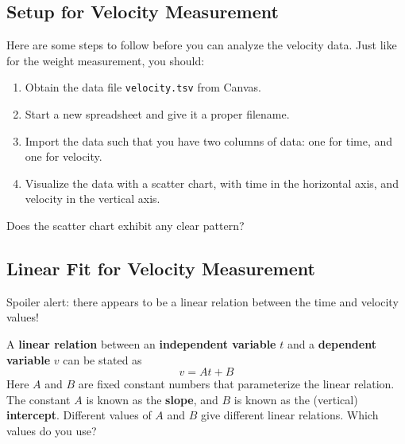 \subsection{Setup for Velocity Measurement}
Here are some steps to follow before you can analyze the velocity data. Just like for the weight measurement, you should:
\begin{enumerate}
    \item Obtain the data file \texttt{velocity.tsv} from Canvas.
    \item Start a new spreadsheet and give it a proper filename.
    \item Import the data such that you have two columns of data: one for time, and one for velocity.
    \item Visualize the data with a scatter chart, with time in the horizontal axis, and velocity in the vertical axis.
\end{enumerate}
Does the scatter chart exhibit any clear pattern?
\begin{center}
\end{center}
\subsection{Linear Fit for Velocity Measurement}
Spoiler alert: there appears to be a linear relation between the time and velocity values!

A \textbf{linear relation} between an \textbf{independent variable} $t$ and a \textbf{dependent variable} $v$ can be stated as
\begin{equation}
    v = A t + B
\end{equation}
Here $A$ and $B$ are fixed constant numbers that parameterize the linear relation. The constant $A$ is known as the \textbf{slope}, and $B$ is known as the (vertical) \textbf{intercept}. Different values of $A$ and $B$ give different linear relations. Which values do you use?
